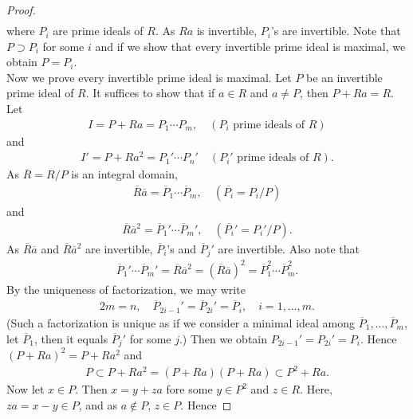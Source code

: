 \documentclass[12pt]{article}
\theoremstyle{plain}
\theoremstyle{remark}
\theoremstyle{definition}
\begin{document}
\begin{proof}
\begin{align*}
    \end{align*}
    where $P_i$ are prime ideals of $R$. As $Ra$ is invertible, $P_i$'s are invertible. Note that $P\supset P_i$ for some $i$ and if we show that every invertible prime ideal is maximal, we obtain $P=P_i$.\\
    Now we prove every invertible prime ideal is maximal. Let $P$ be an invertible prime ideal of $R$. It suffices to show that if $a\in R$ and $a\neq P$, then $P+Ra=R$. Let
    \begin{align*}
        I=P+Ra = P_1\cdots P_m,\quad (P_i\text{ prime ideals of }R)
    \end{align*}
    and
    \begin{align*}
        I'=P+Ra^2 = P_1'\cdots P_n'\quad (P_i'\text{ prime ideals of }R).
    \end{align*}
    As $\overline{R}=R/P$ is an integral domain,
    \begin{align*}
        \overline{R}\overline{a} = \overline{P}_1\cdots\overline{P}_m,\quad (\overline{P_i}=P_i/P)
    \end{align*}
    and
    \begin{align*}
        \overline{R}\overline{a}^2 = \overline{P}_1'\cdots\overline{P}_m',\quad (\overline{P_i}'=P_i'/P).
    \end{align*}
    As $\overline{R}\overline{a}$ and $\overline{R}\overline{a}^2$ are invertible, $\overline{P}_i$'s and $\overline{P}_j'$ are invertible. Also note that
    \begin{align*}
        \overline{P}_1'\cdots\overline{P}_m' =\overline{R}\overline{a}^2 = \left( \overline{R}\overline{a} \right)^2 = \overline{P}_1^2\cdots\overline{P}_m^2.
    \end{align*}
    By the uniqueness of factorization, we may write
    \begin{align*}
        2m=n,\quad \overline{P}_{2i-1}'=\overline{P}_{2i}'=\overline{P}_i,\quad i=1,\dots,m.
    \end{align*}
    (Such a factorization is unique as if we consider a minimal ideal among $\overline{P}_1,\dots,\overline{P}_m$, let $\overline{P}_1$, then it equals $\overline{P}_j'$ for some $j$.) Then we obtain $P_{2i-1}'=P_{2i}'=P_i$. Hence $(P+Ra)^2=P+Ra^2$ and
    \begin{align*}
        P\subset P+Ra^2 = (P+Ra)(P+Ra)\subset P^2+Ra.
    \end{align*}
    Now let $x\in P$. Then $x=y+za$ fore some $y\in P^2$ and $z\in R$. Here, $za = x-y\in P$, and as $a\notin P$, $z\in P$. Hence

\end{proof}
\end{document}
